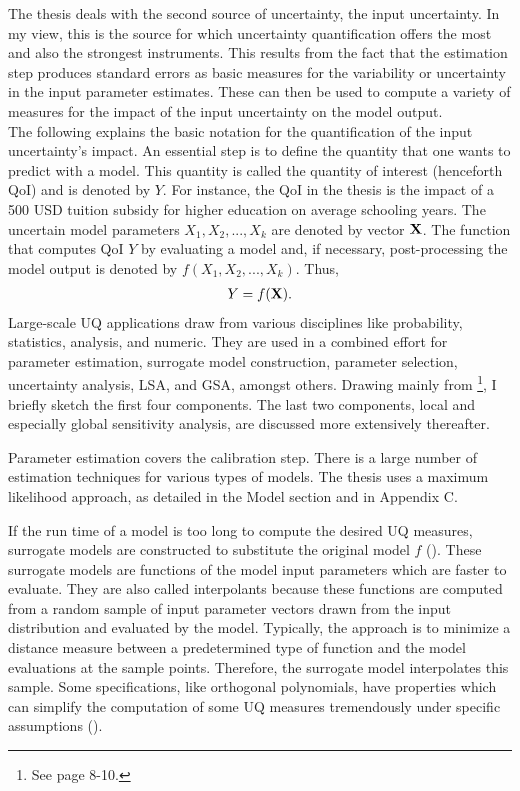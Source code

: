 \documentclass[a4paper,12pt]{article}
\begin{document}
The thesis deals with the second source of uncertainty, the input uncertainty. In my view, this is the source for which uncertainty quantification offers the most and also the strongest instruments. This results from the fact that the estimation step produces standard errors as basic measures for the variability or uncertainty in the input parameter estimates. These can then be used to compute a variety of measures for the impact of the input uncertainty on the model output.\\
\newline
The following explains the basic notation for the quantification of the input uncertainty's impact. An essential step is to define the quantity that one wants to predict with a model. This quantity is called the quantity of interest (henceforth QoI) and is denoted by $Y$. For instance, the QoI in the thesis is the impact of a 500 USD tuition subsidy for higher education on average schooling years. The uncertain model parameters $X_1, X_2, ..., X_k$ are denoted by vector $\bold{X}$. The function that computes QoI $Y$ by evaluating a  model and, if necessary, post-processing the model output is denoted by $f(X_1, X_2, ..., X_k)$. Thus,
\begin{align}
Y = f(\bold{X}).
\end{align}
Large-scale UQ applications draw from various disciplines like probability, statistics, analysis, and numeric. They are used in a combined effort for parameter estimation, surrogate model construction, parameter selection, uncertainty analysis, LSA, and GSA, amongst others. Drawing mainly from \cite{Smith.2014}\footnote{See page 8-10.}, I briefly sketch the first four components. The last two components, local and especially global sensitivity analysis, are discussed more extensively thereafter.

Parameter estimation covers the calibration step. There is a large number of estimation techniques for various types of models. The thesis uses a maximum likelihood approach, as detailed in the Model section and in Appendix C.

If the run time of a model is too long to compute the desired UQ measures, surrogate models are constructed to substitute the original model $f$ (\cite{mcbride2019overview}). These surrogate models are functions of the model input parameters which are faster to evaluate. They are also called interpolants because these functions are computed from a random sample of input parameter vectors drawn from the input distribution and evaluated by the model. Typically, the approach is to minimize a distance measure between a predetermined type of function and the model evaluations at the sample points. Therefore, the surrogate model interpolates this sample. Some specifications, like orthogonal polynomials, have properties which can simplify the computation of some UQ measures tremendously under specific assumptions (\cite{xiu2010numerical}).
\end{document}

